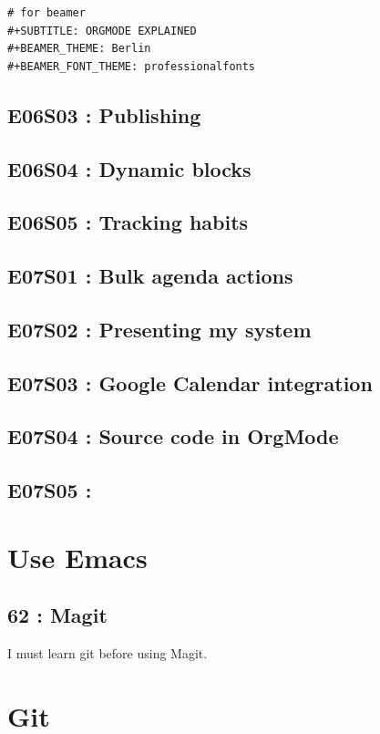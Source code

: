 \documentclass[11pt]{article}
\begin{document}
\begin{verbatim}
# for beamer
#+SUBTITLE: ORGMODE EXPLAINED
#+BEAMER_THEME: Berlin
#+BEAMER_FONT_THEME: professionalfonts
\end{verbatim}

\subsection{E06S03 : Publishing}
\label{sec:org73455a5}
\subsection{E06S04 : Dynamic blocks}
\label{sec:orgf0e607d}
\subsection{E06S05 : Tracking habits}
\label{sec:orge03268a}
\subsection{E07S01 : Bulk agenda actions}
\label{sec:org785658f}
\subsection{E07S02 : Presenting my system}
\label{sec:org78c9c17}
\subsection{E07S03 : Google Calendar integration}
\label{sec:orgec4b642}
\subsection{E07S04 : Source code in OrgMode}
\label{sec:orgd3c526b}
\subsection{E07S05 :}
\label{sec:org0055687}
\section{Use Emacs}
\label{sec:org72a7acd}
\subsection{62 : Magit}
\label{sec:org08bcb15}
I must learn git before using Magit.

\section{Git}
\label{sec:org7867e5d}
\end{document}

